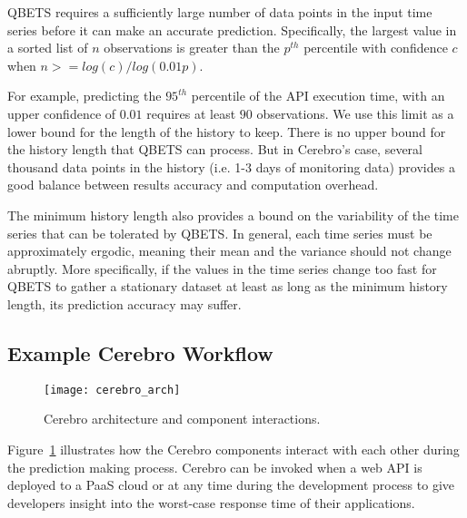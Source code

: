 QBETS requires a sufficiently large number of data points
in the input time series before it can make an accurate prediction. 
Specifically, the largest value in a sorted list of $n$ observations is
greater than the $p^{th}$ percentile with confidence $c$ when $n >=
log(c)/log(0.01p)$.

For example, predicting the $95^{th}$ percentile
of the API execution time, with an upper confidence of $0.01$ requires at
least $90$ observations. We use this limit as a lower bound for the length
of the history to keep. There is no upper bound for the history length
that QBETS can process. But in Cerebro's case, several thousand data points
in the history (i.e. 1-3 days of monitoring data) provides a good balance between
results accuracy and computation overhead.

The minimum history length also provides a bound on the variability of the
time series that can be tolerated by QBETS. In general, each time series must be
approximately ergodic, meaning their mean and the variance should not change abruptly.
More specifically, if the values in the time series change too fast for QBETS to gather
a stationary dataset at least as long as the minimum history length, its prediction 
accuracy may suffer.

\subsection{Example Cerebro Workflow}

\begin{figure}
\centering
\texttt{[image: cerebro\_arch]}
\caption{Cerebro architecture and component interactions.}
\label{fig:cerebro_arch}
\end{figure}

Figure~\ref{fig:cerebro_arch} illustrates how the Cerebro components interact with
each other during the prediction making process.  Cerebro can be
invoked when a web API is deployed to a PaaS cloud or at any time during the development
process to give developers insight into the worst-case response time of their
applications.

